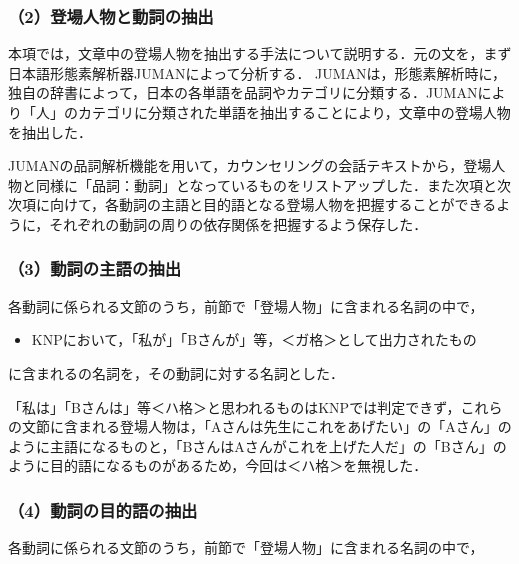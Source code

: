\documentclass[shuuron]{kuee}
\begin{document}
\subsubsection{（2）登場人物と動詞の抽出}


本項では，文章中の登場人物を抽出する手法について説明する．元の文を，まず日本語形態素解析器JUMAN\cite{juman}によって分析する． JUMANは，形態素解析時に，独自の辞書によって，日本の各単語を品詞やカテゴリに分類する．JUMANにより「人」のカテゴリに分類された単語を抽出することにより，文章中の登場人物を抽出した．%

JUMANの品詞解析機能を用いて，カウンセリングの会話テキストから，登場人物と同様に「品詞：動詞」となっているものをリストアップした．また次項と次次項に向けて，各動詞の主語と目的語となる登場人物を把握することができるように，それぞれの動詞の周りの依存関係を把握するよう保存した．



\subsubsection{（3）動詞の主語の抽出}


各動詞に係られる文節のうち，前節で「登場人物」に含まれる名詞の中で，

\begin{itemize}

  \item KNPにおいて，「私が」「Bさんが」等，＜ガ格＞として出力されたもの
\end{itemize}
に含まれるの名詞を，その動詞に対する名詞とした．

「私は」「Bさんは」等＜ハ格＞と思われるものはKNPでは判定できず，これらの文節に含まれる登場人物は，「Aさんは先生にこれをあげたい」の「Aさん」のように主語になるものと，「BさんはAさんがこれを上げた人だ」の「Bさん」のように目的語になるものがあるため，今回は＜ハ格＞を無視した．

\subsubsection{（4）動詞の目的語の抽出}


各動詞に係られる文節のうち，前節で「登場人物」に含まれる名詞の中で，
\end{document}
